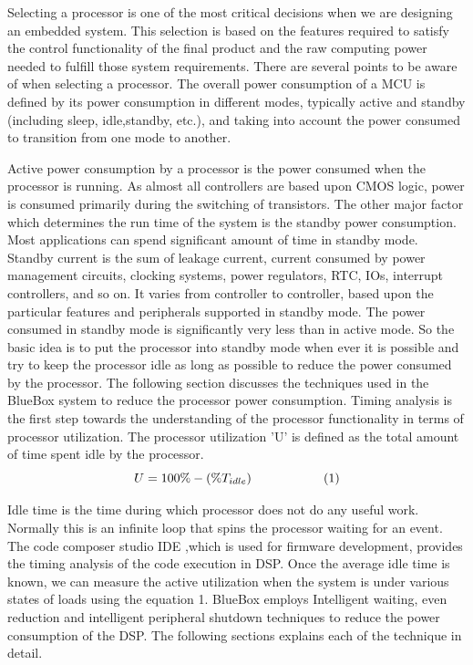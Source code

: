 Selecting a processor is one of the most critical decisions when we are designing an embedded 
system. This selection is based on the features required to satisfy the control functionality of the final product and the raw computing power needed to fulfill those system requirements. There are several points to be aware of when selecting a processor. The overall power consumption of a MCU is defined by its power consumption in different modes, typically active and standby (including sleep, idle,standby, etc.),  and taking into account the power consumed to transition from one mode to another. 

Active power consumption by a processor is the power consumed when the processor is running. As almost all controllers are based upon CMOS logic, power is consumed primarily during the switching of transistors. The other major factor which determines the run time of the system is the standby power consumption. Most applications can spend significant amount of time in standby mode. Standby current is the sum of leakage current, current consumed by power management circuits, clocking systems, power regulators, RTC, IOs, interrupt controllers, and so on. It varies from controller to controller, based upon the particular features and peripherals supported in standby mode.  
The power consumed in standby mode is significantly very less than in active mode. So the basic idea is to put the processor into standby mode when ever it is possible and try to keep the processor idle as long as possible to reduce the power consumed by the processor. The following section discusses the techniques used in the BlueBox system to reduce the processor power consumption. 
Timing analysis is the first step towards the understanding of the processor functionality in terms of processor utilization. The processor utilization 'U' is defined as the total amount of time spent idle by the processor. 
\[ U = 100\% - (\% T_{idle}) \hspace{20mm} (1)\]

Idle time is the time during which processor does not do any useful work. Normally this is an infinite loop that spins the processor waiting for an event. The code composer studio IDE ,which is used for firmware development,  provides the timing analysis of the code execution in DSP. Once the average idle time is known, we can measure the active utilization when the system is under various states of loads using the equation 1. BlueBox employs Intelligent waiting, even reduction and intelligent peripheral shutdown techniques to reduce the power consumption of the DSP. The following sections explains each of the technique in detail. 

